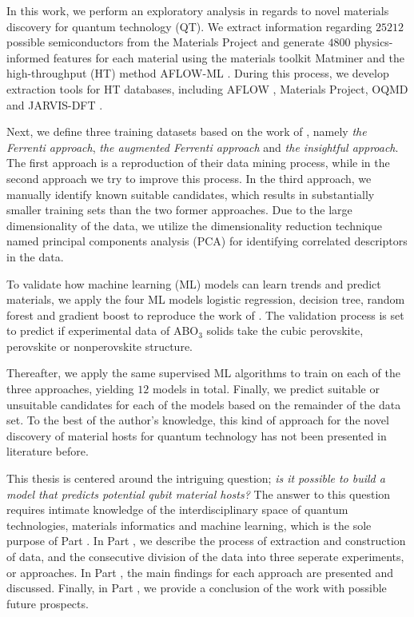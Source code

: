In this work, we perform an exploratory analysis in regards to novel materials discovery for quantum technology (QT). We extract information regarding $25212$ possible semiconductors from the Materials Project \cite{Jain2013, Jain2016, Jain2018} and generate $4800$ physics-informed features for each material using the materials toolkit Matminer \cite{Ward2018} and the high-throughput (HT) method AFLOW-ML \cite{Isayev2017}.
During this process, we develop extraction tools for HT databases, including AFLOW \cite{Curtarolo2012, Curtarolo2012a, Calderon2015}, Materials Project, OQMD \cite{Saal2013, Kirklin2015} and JARVIS-DFT \cite{Choudhary2020}.

Next, we define three training datasets based on the work of \citeauthor{Ferrenti2020} \cite{Ferrenti2020}, namely \textit{the Ferrenti approach}, \textit{the augmented Ferrenti approach} and \textit{the insightful approach}. The first approach is a reproduction of their data mining process, while in the second approach we try to improve this process. In the third approach, we manually identify known suitable candidates, which results in substantially smaller training sets than the two former approaches. Due to the large dimensionality of the data, we utilize the dimensionality reduction technique named principal components analysis (PCA) for identifying correlated descriptors in the data.

To validate how machine learning (ML) models can learn trends and predict materials, we apply the four ML models logistic regression, decision tree, random forest and gradient boost to reproduce the work of \citeauthor{Balachandran2018} \cite{Balachandran2018}. The validation process is set to predict if experimental data of ABO$_3$ solids take the cubic perovskite, perovskite or nonperovskite structure.

Thereafter, we apply the same supervised ML algorithms to train on each of the three approaches, yielding $12$ models in total. Finally, we predict suitable or unsuitable candidates for each of the models based on the remainder of the data set. To the best of the author's knowledge, this kind of approach for the novel discovery of material hosts for quantum technology has not been presented in literature before. %

This thesis is centered around the intriguing question; \textit{is it possible to build a model that predicts potential qubit material hosts?} The answer to this question requires intimate knowledge of the interdisciplinary space of quantum technologies, materials informatics and machine learning, which is the sole purpose of Part .
In Part , we describe the process of extraction and construction of data, and the consecutive division of the data into three seperate experiments, or approaches. In Part , the main findings for each approach are presented and discussed. Finally, in Part , we provide a conclusion of the work with possible future prospects.



